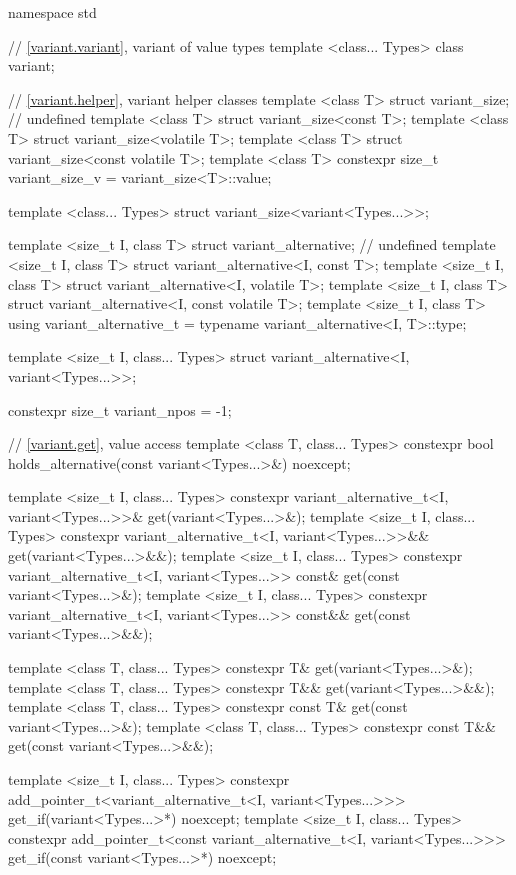 \begin{codeblock}
namespace std {
  // \ref{variant.variant}, variant of value types
  template <class... Types> class variant;

  // \ref{variant.helper}, variant helper classes
  template <class T> struct variant_size; // undefined
  template <class T> struct variant_size<const T>;
  template <class T> struct variant_size<volatile T>;
  template <class T> struct variant_size<const volatile T>;
  template <class T> constexpr size_t variant_size_v
    = variant_size<T>::value;

  template <class... Types>
    struct variant_size<variant<Types...>>;

  template <size_t I, class T> struct variant_alternative; // undefined
  template <size_t I, class T> struct variant_alternative<I, const T>;
  template <size_t I, class T> struct variant_alternative<I, volatile T>;
  template <size_t I, class T> struct variant_alternative<I, const volatile T>;
  template <size_t I, class T>
    using variant_alternative_t = typename variant_alternative<I, T>::type;

  template <size_t I, class... Types>
    struct variant_alternative<I, variant<Types...>>;

  constexpr size_t variant_npos = -1;

  // \ref{variant.get}, value access
  template <class T, class... Types>
    constexpr bool holds_alternative(const variant<Types...>&) noexcept;

  template <size_t I, class... Types>
    constexpr variant_alternative_t<I, variant<Types...>>&
    get(variant<Types...>&);
  template <size_t I, class... Types>
    constexpr variant_alternative_t<I, variant<Types...>>&&
    get(variant<Types...>&&);
  template <size_t I, class... Types>
    constexpr variant_alternative_t<I, variant<Types...>> const&
    get(const variant<Types...>&);
  template <size_t I, class... Types>
    constexpr variant_alternative_t<I, variant<Types...>> const&&
    get(const variant<Types...>&&);

  template <class T, class... Types>
    constexpr T& get(variant<Types...>&);
  template <class T, class... Types>
    constexpr T&& get(variant<Types...>&&);
  template <class T, class... Types>
    constexpr const T& get(const variant<Types...>&);
  template <class T, class... Types>
    constexpr const T&& get(const variant<Types...>&&);

  template <size_t I, class... Types>
    constexpr add_pointer_t<variant_alternative_t<I, variant<Types...>>>
    get_if(variant<Types...>*) noexcept;
  template <size_t I, class... Types>
    constexpr add_pointer_t<const variant_alternative_t<I, variant<Types...>>>
    get_if(const variant<Types...>*) noexcept;

}
\end{codeblock}
